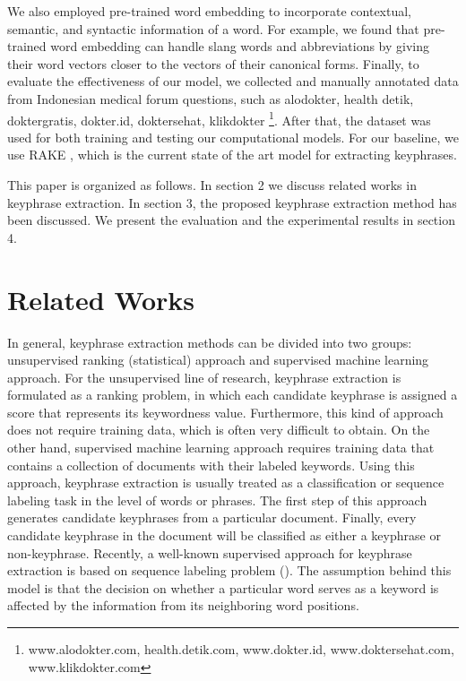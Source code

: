 We also employed pre-trained word embedding to incorporate contextual, semantic, and syntactic information of a word. For example, we found that pre-trained word embedding can handle slang words and abbreviations by giving their word vectors closer to the vectors of their canonical forms. Finally, to evaluate the effectiveness of our model, we collected and manually annotated data from Indonesian medical forum questions, such as alodokter, health detik, doktergratis, dokter.id, doktersehat, klikdokter \footnote{www.alodokter.com, health.detik.com, www.dokter.id, www.doktersehat.com, www.klikdokter.com}. After that, the dataset was used for both training and testing our computational models. For our baseline, we use RAKE  \cite{rake}, which is the current state of the art model for extracting keyphrases.


This paper is organized as follows.  In section 2 we discuss related works in keyphrase extraction. In section 3, the proposed keyphrase extraction method has been discussed. We present the evaluation and the experimental results in section 4. 

\section{Related Works}
In general, keyphrase extraction methods can be divided into two groups: unsupervised ranking (statistical) approach and supervised machine learning approach. For the unsupervised line of research, keyphrase extraction is formulated as a ranking problem, in which each candidate keyphrase is assigned a score that represents its keywordness value. Furthermore, this kind of approach does not require training data, which is often very difficult to obtain. On the other hand, supervised machine learning approach requires training data that contains a collection of documents with their labeled keywords. Using this approach, keyphrase extraction is usually treated as a classification or sequence labeling task in the level of words or phrases. The first step of this approach generates candidate keyphrases from a particular document. Finally, every candidate keyphrase in the document will be classified as either a keyphrase or non-keyphrase. Recently, a well-known supervised approach for keyphrase extraction is based on sequence labeling problem (\cite{zhang2008automatic}\cite{cao2010automatically}\cite{zhang2016keyphrase}). The assumption behind this model is that the decision on whether a particular word serves as a keyword is affected by the information from its neighboring word positions.

